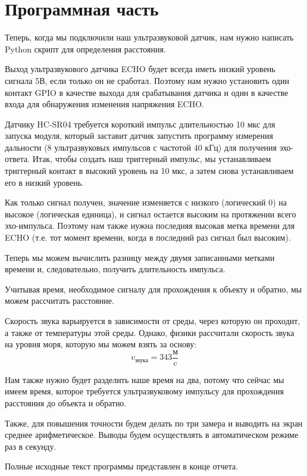 \documentclass[a4paper, 14pt]{article}
\begin{document}
\newpage
\section{Программная часть}

Теперь, когда мы подключили наш ультразвуковой датчик, нам нужно написать Python скрипт для определения расстояния.

Выход ультразвукового датчика ECHO будет всегда иметь низкий уровень сигнала 5В, если только он не сработал. Поэтому нам нужно установить один контакт GPIO в качестве выхода для срабатывания датчика и один в качестве входа для обнаружения изменения напряжения ECHO.

Датчику HC-SR04 требуется короткий импульс длительностью 10 мкс для запуска модуля, который заставит датчик запустить программу измерения дальности (8 ультразвуковых импульсов с частотой 40 кГц) для получения эхо-ответа. Итак, чтобы создать наш триггерный импульс, мы устанавливаем триггерный контакт в высокий уровень на 10 мкс, а затем снова устанавливаем его в низкий уровень.

Как только сигнал получен, значение изменяется с низкого (логический 0) на высокое (логическая единица), и сигнал остается высоким на протяжении всего эхо-импульса. Поэтому нам также нужна последняя высокая метка времени для ECHO (т.е. тот момент времени, когда в последний раз сигнал был высоким).

Теперь мы можем вычислить разницу между двумя записанными метками времени и, следовательно, получить длительность импульса.

Учитывая время, необходимое сигналу для прохождения к объекту и обратно, мы можем рассчитать расстояние.

Скорость звука варьируется в зависимости от среды, через которую он проходит, а также от температуры этой среды. Однако, физики рассчитали скорость звука на уровня моря, которую мы можем взять за основу:
$$v_{\text{звука}} = 343 \frac{\text{м}}{\text{c}}$$

Нам также нужно будет разделить наше время на два, потому что сейчас мы имеем время, которое требуется ультразвуковому импульсу для прохождения расстояния до объекта и обратно.

Также, для повышения точности будем делать по три замера и выводить на экран среднее арифметическое. Выводы будем осуществлять в автоматическом режиме раз в секунду.

Полные исходные текст программы представлен в конце отчета.

\newpage
\end{document}
